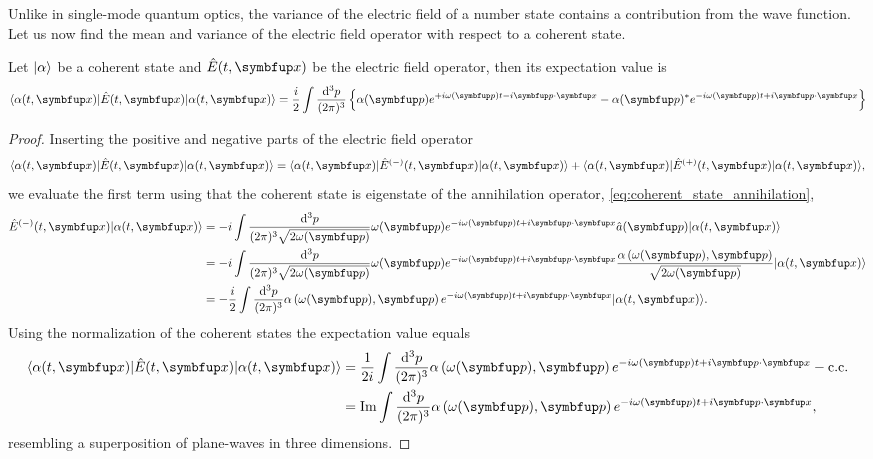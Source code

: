 Unlike in single-mode quantum optics, the variance of the electric field of a number state contains a contribution from the wave function.
Let us now find the mean and variance of the electric field operator with respect to a coherent state.
\begin{theorem}
	Let $\lvert\alpha\rangle$ be a coherent state and $\hat{E}(t,\vb{x})$ be the electric field operator, then its expectation value is
	\begin{equation}
		\bra{\alpha(t,\vb{x})}
		\hat{E}(t,\vb{x})
		\ket{\alpha(t,\vb{x})}
		=
		\frac{i}{2}
		\int\frac{\dd[3]{p}}{(2\pi)^3}
		\left\{
			\alpha(\vb{p})
			e^{+i\omega(\vb{p})t-i\vb{p}\vdot\vb{x}}
			-
			\alpha(\vb{p})^*
			e^{-i\omega(\vb{p})t+i\vb{p}\vdot\vb{x}}
		\right\}
	\end{equation}
\end{theorem}
\begin{proof}
	Inserting the positive and negative parts of the electric field operator
	\begin{equation}
		\bra{\alpha(t,\vb{x})}
		\hat{E}(t,\vb{x})
		\ket{\alpha(t,\vb{x})}
		=
		\bra{\alpha(t,\vb{x})}
		\hat{E}^{(-)}(t,\vb{x})
		\ket{\alpha(t,\vb{x})}
		+
		\bra{\alpha(t,\vb{x})}
		\hat{E}^{(+)}(t,\vb{x})
		\ket{\alpha(t,\vb{x})}
		,
	\end{equation}
	we evaluate the first term using that the coherent state is eigenstate of the annihilation operator, \cref{eq:coherent_state_annihilation},
	\begin{equation*}
		\begin{split}
			\hat{E}^{(-)}(t,\vb{x})
			\ket{\alpha(t,\vb{x})}
			&=
			-i\int\frac{\dd[3]{p}}{(2\pi)^3\sqrt{2\omega(\vb{p})}}
			\omega(\vb{p})
			e^{-i\omega(\vb{p})t+i\vb{p}\vdot\vb{x}}
			\hat{a}(\vb{p})
			\ket{\alpha(t,\vb{x})}
			\\
			&=
			-i\int\frac{\dd[3]{p}}{(2\pi)^3\sqrt{2\omega(\vb{p})}}
			\omega(\vb{p})
			e^{-i\omega(\vb{p})t+i\vb{p}\vdot\vb{x}}
			\frac{\alpha\left(\omega(\vb{p}),\vb{p}\right)}{\sqrt{2\omega(\vb{p})}}
			\ket{\alpha(t,\vb{x})}
			\\
			&=
			-\frac{i}{2}
			\int\frac{\dd[3]{p}}{(2\pi)^3}
			\alpha\left(\omega(\vb{p}),\vb{p}\right)
			e^{-i\omega(\vb{p})t+i\vb{p}\vdot\vb{x}}
			\ket{\alpha(t,\vb{x})}
			.
		\end{split}
	\end{equation*}
	Using the normalization of the coherent states the expectation value equals
	\begin{equation}
		\begin{split}
			\bra{\alpha(t,\vb{x})}
			\hat{E}(t,\vb{x})
			\ket{\alpha(t,\vb{x})}
			&=
			\frac{1}{2i}
			\int\frac{\dd[3]{p}}{(2\pi)^3}
			\alpha\left(\omega(\vb{p}),\vb{p}\right)
			e^{-i\omega(\vb{p})t+i\vb{p}\vdot\vb{x}}
			-
			\text{c.c.}
			\\
			&=
			\Im
			\int\frac{\dd[3]{p}}{(2\pi)^3}
			\alpha\left(\omega(\vb{p}),\vb{p}\right)
			e^{-i\omega(\vb{p})t+i\vb{p}\vdot\vb{x}}
			,
		\end{split}
	\end{equation}
	resembling a superposition of plane-waves in three dimensions.
\end{proof}